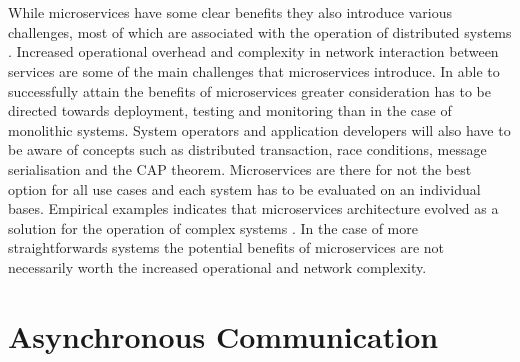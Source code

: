 \\ \\
While microservices have some clear benefits they also introduce various challenges, most of which are associated with the operation of distributed systems \cite{deutsch2004eight}. Increased operational overhead and complexity in network interaction between services are some of the main challenges that microservices introduce. In able to successfully attain the benefits of microservices greater consideration has to be directed towards deployment, testing and monitoring than in the case of monolithic systems. System operators and application developers will also have to be aware of concepts such as distributed transaction, race conditions, message serialisation and the CAP theorem. Microservices are there for not the best option for all use cases and each system has to be evaluated on an individual bases. Empirical examples indicates that microservices architecture evolved as a solution for the operation of complex systems \cite{thones2015microservices, microservicesNetflix}. In the case of more straightforwards systems the potential benefits of microservices are not necessarily worth the increased operational and network complexity.

\section{Asynchronous Communication}

